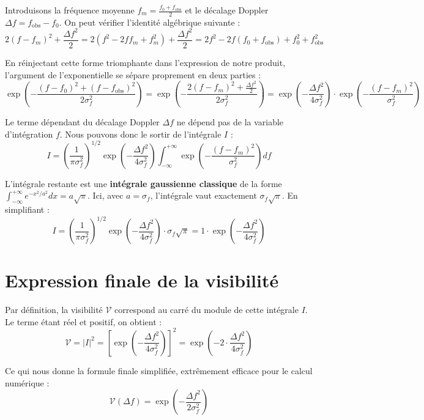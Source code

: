 \documentclass[11pt,a4paper]{article}
\begin{document}
Introduisons la fréquence moyenne $f_m = \frac{f_0 + f_{\text{obs}}}{2}$ et le décalage Doppler $\Delta f = f_{\text{obs}} - f_0$. On peut vérifier l'identité algébrique suivante :
\begin{equation}
    2(f - f_m)^2 + \frac{\Delta f^2}{2} = 2\left(f^2 - 2ff_m + f_m^2\right) + \frac{\Delta f^2}{2} = 2f^2 - 2f(f_0 + f_{\text{obs}}) + f_0^2 + f_{\text{obs}}^2
\end{equation}

En réinjectant cette forme triomphante dans l'expression de notre produit, l'argument de l'exponentielle se sépare proprement en deux parties :
\begin{equation}
    \exp\left( - \frac{(f - f_0)^2 + (f - f_{\text{obs}})^2}{2\sigma_f^2} \right) = \exp\left( - \frac{2(f - f_m)^2 + \frac{\Delta f^2}{2}}{2\sigma_f^2} \right) = \exp\left( - \frac{\Delta f^2}{4\sigma_f^2} \right) \cdot \exp\left( - \frac{(f - f_m)^2}{\sigma_f^2} \right)
\end{equation}

Le terme dépendant du décalage Doppler $\Delta f$ ne dépend pas de la variable d'intégration $f$. Nous pouvons donc le sortir de l'intégrale $I$ :
\begin{equation}
    I = \left(\frac{1}{\pi \sigma_f^2}\right)^{1/2} \exp\left( - \frac{\Delta f^2}{4\sigma_f^2} \right) \int_{-\infty}^{+\infty} \exp\left( - \frac{(f - f_m)^2}{\sigma_f^2} \right) df
\end{equation}

L'intégrale restante est une \textbf{intégrale gaussienne classique} de la forme $\int_{-\infty}^{+\infty} e^{-x^2/a^2} dx = a\sqrt{\pi}$. Ici, avec $a = \sigma_f$, l'intégrale vaut exactement $\sigma_f\sqrt{\pi}$. En simplifiant :
\begin{equation}
    I = \left(\frac{1}{\pi \sigma_f^2}\right)^{1/2} \exp\left( - \frac{\Delta f^2}{4\sigma_f^2} \right) \cdot \sigma_f\sqrt{\pi} = 1 \cdot \exp\left( - \frac{\Delta f^2}{4\sigma_f^2} \right)
\end{equation}

\section{Expression finale de la visibilité}
Par définition, la visibilité $\mathcal{V}$ correspond au carré du module de cette intégrale $I$. Le terme étant réel et positif, on obtient :
\begin{equation}
    \mathcal{V} = |I|^2 = \left[ \exp\left( - \frac{\Delta f^2}{4\sigma_f^2} \right) \right]^2
    = \exp\left( - 2 \cdot \frac{\Delta f^2}{4\sigma_f^2} \right)
\end{equation}

Ce qui nous donne la formule finale simplifiée, extrêmement efficace pour le calcul numérique :
\begin{equation}
    \boxed{\mathcal{V}(\Delta f) = \exp\left( - \frac{\Delta f^2}{2\sigma_f^2} \right)}
\end{equation}
\end{document}
